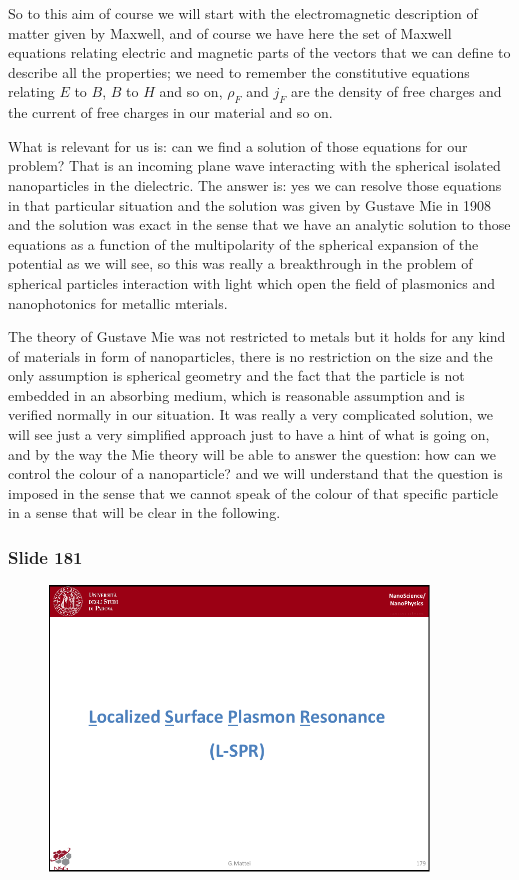 \documentclass[../main/main.tex]{subfiles}
\begin{document}
So to this aim of course we will start with the electromagnetic description of matter given by Maxwell, and of course we have here the set of Maxwell equations relating electric and magnetic parts of the vectors that we can define to describe all the properties; we need to remember the constitutive equations relating $E$ to $B$, $B$ to $H$ and so on, $\rho_F$ and $j_F$ are the density of free charges and the current of free charges in our material and so on.

What is relevant for us is: can we find a solution of those equations for our problem? That is an incoming plane wave interacting with the spherical isolated nanoparticles in the dielectric. The answer is: yes we can resolve those equations in that particular situation and the solution was given by Gustave Mie in 1908 and the solution was exact in the sense that we have an analytic solution to those equations as a function of the multipolarity of the spherical expansion of the potential as we will see, so this was really a breakthrough in the problem of spherical particles interaction with light which open the field of plasmonics and nanophotonics for metallic mterials. 

The theory of Gustave Mie was not restricted to metals but it holds for any kind of materials in form of nanoparticles, there is no restriction on the size and the only assumption is spherical geometry and the fact that the particle is not embedded in an absorbing medium, which is reasonable assumption and is verified normally in our situation. It was really a very complicated solution, we will see just a very simplified approach just to have a hint of what is going on, and by the way the Mie theory will be able to answer the question: how can we control the colour of a nanoparticle? and we will understand that the question is imposed in the sense that we cannot speak of the colour of that specific particle in a sense that will be clear in the following.

\newpage

\subsubsection{Slide 181}

\begin{figure}[h!]
\centering
\includegraphics[page=3,width=0.9\textwidth]{../lessons/pdf_file/11_lesson.pdf}
\end{figure}
\end{document}
